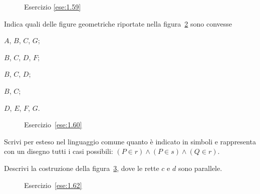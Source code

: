 \begin{inaccessibleblock}
 \begin{figure}[htb]
 \centering
 \caption{Esercizio \ref{ese:1.59}}\label{fig:ese1.59}
\end{figure}
\end{inaccessibleblock}

\begin{esercizio}
\label{ese:1.60}
Indica quali delle figure geometriche riportate nella 
figura~\ref{fig:ese1.60} sono convesse
\begin{multicols}{5}
\begin{enumeratea}
\item \(A\), \(B\), \(C\), \(G\);
\item \(B\), \(C\), \(D\), \(F\);
\item \(B\), \(C\), \(D\);
\item \(B\), \(C\);
\item \(D\), \(E\), \(F\), \(G\).
\end{enumeratea}
\end{multicols}
\end{esercizio}


\begin{inaccessibleblock}
 \begin{figure}[htb]
 \centering
 \caption{Esercizio~\ref{ese:1.60}}\label{fig:ese1.60}
\end{figure}
\end{inaccessibleblock}

\begin{esercizio}
\label{ese:1.61}
Scrivi per esteso nel linguaggio comune quanto è indicato in simboli 
e rappresenta con un disegno tutti i casi possibili: \((P\in r)\wedge 
(P\in s)\wedge (Q\in r)\).
\end{esercizio}

\begin{esercizio}
\label{ese:1.62}
Descrivi la costruzione della figura~\ref{fig:ese1.62}, dove le rette 
\(c\) e \(d\) sono parallele.
\end{esercizio}


\begin{inaccessibleblock}
 \begin{figure}[htb]
 \centering
 \caption{Esercizio~\ref{ese:1.62}}\label{fig:ese1.62}
\end{figure}
\end{inaccessibleblock}
 
